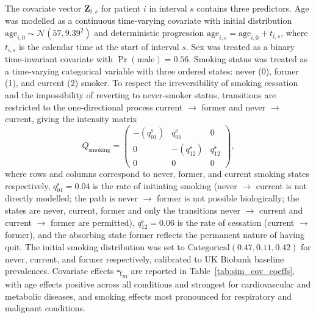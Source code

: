 \documentclass[12pt]{article}
\begin{document}
The covariate vector $\mathbf{Z}_{i,s}$ for patient $i$ in interval $s$ contains three predictors. Age was modelled as a continuous time-varying covariate with initial distribution $\mathrm{age}_{i,0} \sim \mathcal{N}(57, 9.39^2)$ and deterministic progression $\mathrm{age}_{i,s} = \mathrm{age}_{i,0} + t_{i,s}$, where $t_{i,s}$ is the calendar time at the start of interval $s$. Sex was treated as a binary time-invariant covariate with $\Pr(\mathrm{male}) = 0.56$. Smoking status was treated as a time-varying categorical variable with three ordered states: never (0), former (1), and current (2) smoker. To respect the irreversibility of smoking cessation and the impossibility of reverting to never-smoker status, transitions are restricted to the one-directional process current $\to$ former and never $\to$ current, giving the intensity matrix
\[
Q_{\mathrm{smoking}} =
\begin{pmatrix}
-(q_{01}^{\mathrm{s}}) & q_{01}^{\mathrm{s}} & 0 \\
0 & -(q_{12}^{\mathrm{s}}) & q_{12}^{\mathrm{s}} \\
0 & 0 & 0
\end{pmatrix},
\]
where rows and columns correspond to never, former, and current smoking states respectively, $q_{01}^{\mathrm{s}} = 0.04$ is the rate of initiating smoking (never $\to$ current is not directly modelled; the path is never $\to$ former is not possible biologically; the states are never, current, former and only the transitions never $\to$ current and current $\to$ former are permitted), $q_{12}^{\mathrm{s}} = 0.06$ is the rate of cessation (current $\to$ former), and the absorbing state former reflects the permanent nature of having quit. The initial smoking distribution was set to $\mathrm{Categorical}(0.47, 0.11, 0.42)$ for never, current, and former respectively, calibrated to UK Biobank baseline prevalences. Covariate effects $\boldsymbol{\gamma}_m$ are reported in Table~\ref{tab:sim_cov_coeffs}, with age effects positive across all conditions and strongest for cardiovascular and metabolic diseases, and smoking effects most pronounced for respiratory and malignant conditions.
\end{document}
